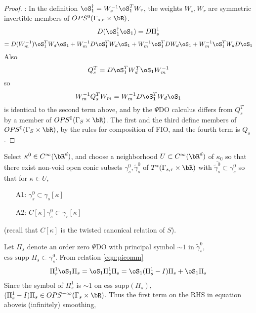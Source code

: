 \begin{proof}: In the definition $\oS_1^{\dagger}=W_s^{-1}\oS_1^TW_r$, the weights $W_s, W_r$ are symmetric invertible members of $OPS^{0}(\Gamma_{s,r} \times \bR)$.
\[
D(\oS_1^{\dagger}\oS_1) = D\Pi^1_s
\]
\[
=D(W_m^{-1})\oS_1^TW_d \oS_1 + W_m^{-1}D\oS_1^TW_d \oS_1 + W_m^{-1}\oS_1^TDW_d \oS_1 + W_m^{-1}\oS_1^TW_dD\oS_1
\]
Also 
\[
Q_s^T = D\oS_1^T W_d ^T\oS_1 W_m^{-1}
\]
so
\[
W_m^{-1}Q_s^TW_m = W_m^{-1}D\oS_1^TW_d \oS_1
\]
is identical to the second term above, and by the $\Psi$DO calculus differs from $Q_s^T$ by a member of  $OPS^0(\Gamma_S \times \bR)$. The first and the third define members of $OPS^0(\Gamma_S \times \bR)$, by the rules for composition of FIO, and the fourth term is $Q_s$. \end{proof}

Select $\kappa^0 \in C^{\infty}(\bR^d)$, and choose a neighborhood $U \subset C^{\infty}(\bR^d)$ of $\kappa_0$ so that there exist non-void open conic subsets $\gamma^0_s, \tilde{\gamma}^0_s$ of $ T^*(\Gamma_{s,r} \times \bR)$ with $\overline{\tilde{\gamma}^0_s} \subset \gamma^0_s$ so that for $\kappa \in U$, 
\begin{itemize}
\item[A1: ] $\gamma^0_s \subset \gamma_s[\kappa]$
\item[A2: ] $C[\kappa]\gamma^0_s \subset  \gamma_r[\kappa]$
\end{itemize}
(recall that $C[\kappa]$ is the twisted canonical relation of $S$).

Let $\Pi_s$ denote an order zero $\Psi$DO with principal symbol $\sim 1$ in $\tilde{\gamma}^0_s$, $\mbox{ess supp }\Pi_s \subset \gamma^0_s$. From relation \ref{eqn:picomm}
\begin{eqnarray}
\label{eqn:pistuff3}
\Pi^1_r \oS_1 \Pi_s = \oS_1 \Pi^1_s \Pi_s  =\oS_1(\Pi_s^1-I)\Pi_s + \oS_1 \Pi_s
\end{eqnarray}
Since the symbol of $\Pi^1_s$ is $ \sim 1$ on $\mbox{ess supp}(\Pi_s)$, $(\Pi_s^1-I)\Pi_s \in OPS^{-\infty}(\Gamma_s \times \bR)$. Thus the first term on the RHS in equation aboveis (infinitely) smoothing, 

